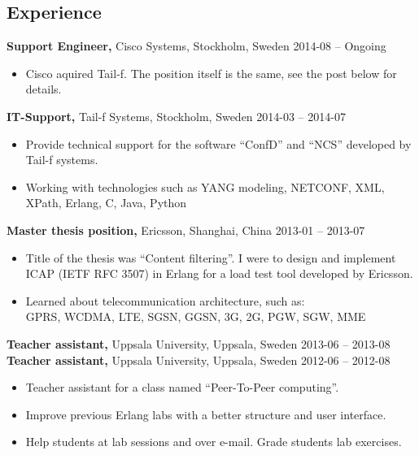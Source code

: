 \documentclass[margin]{res}
\begin{document}

\address{{\bf Contact information}\\

linkedin.com/in/tommymattsson\\
github.com/Taddic\\
}

\address{{\bf Address}\\
  \\
}

\begin{resume}

\section{Experience}
{\bf Support Engineer,} Cisco Systems, Stockholm, Sweden \hfill 2014-08 -- Ongoing
 \begin{itemize} \itemsep -2pt  %
 \item Cisco aquired Tail-f. The position itself is the same, see
   the post below for details.
 \end{itemize}

{\bf IT-Support,} Tail-f Systems, Stockholm, Sweden \hfill 2014-03 -- 2014-07
 \begin{itemize} \itemsep -2pt  %
 \item Provide technical support for the software ``ConfD'' and ``NCS''
   developed by Tail-f systems.
 \item Working with technologies such as YANG modeling, NETCONF,
   XML, XPath, Erlang, C, Java, Python
 \end{itemize}

{\bf Master thesis position,} Ericsson, Shanghai, China \hfill 2013-01 -- 2013-07
 \begin{itemize} \itemsep -2pt  %
 \item Title of the thesis was ``Content filtering''. I were to design
   and implement ICAP (IETF RFC 3507) in Erlang for a load test tool
   developed by Ericsson.
 \item Learned about telecommunication architecture, such as: \\
 GPRS, WCDMA, LTE, SGSN, GGSN, 3G, 2G, PGW, SGW, MME
 \end{itemize}

{\bf Teacher assistant,} Uppsala University, Uppsala, Sweden \hfill 2013-06 -- 2013-08\\
{\bf Teacher assistant,} Uppsala University, Uppsala, Sweden \hfill 2012-06 -- 2012-08
 \begin{itemize} \itemsep -2pt  %
 \item Teacher assistant for a class named ``Peer-To-Peer computing''.
 \item Improve previous Erlang labs with a better structure and user interface.
 \item Help students at lab sessions and over e-mail. Grade students lab exercises.
 \end{itemize}


\end{resume}
\end{document}
